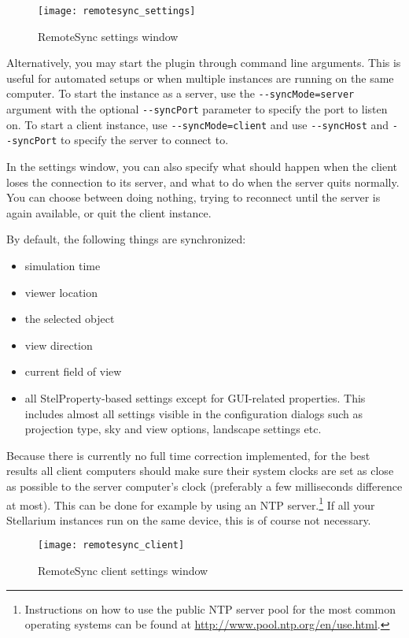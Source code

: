 \begin{figure}[h]
	\centering\texttt{[image: remotesync\_settings]}
	\caption{RemoteSync settings window}
	\label{fig:plugins:RemoteSync:settings}
\end{figure}

Alternatively, you may start the plugin through command line arguments. This is
useful for automated setups or when multiple instances are running on the same
computer. To start the instance as a server, use the
\texttt{-{}-syncMode=server} argument with the optional \texttt{-{}-syncPort}
parameter to specify the port to listen on. To start a client instance, use
\texttt{-{}-syncMode=client} and use \texttt{-{}-syncHost} and
\texttt{-{}-syncPort} to specify the server to connect to.

In the settings window, you can also specify what should happen when the client 
loses the connection to its server, and what to do when the server quits 
normally. You can choose between doing nothing, trying to reconnect until the 
server is again available, or quit the client instance.

By default, the following things are synchronized:
\begin{itemize}
	\item simulation time
	\item viewer location
	\item the selected object
	\item view direction
	\item current field of view
	\item all StelProperty-based settings except for GUI-related properties. 
	This includes almost all settings visible in the configuration dialogs such 
	as projection type, sky and view options, landscape settings etc.
\end{itemize}

Because there is currently no full time correction implemented, for the best
results all client computers should make sure their system clocks are set as
close as possible to the server computer's clock (preferably a few milliseconds
difference at most). This can be done for example by using an NTP server.\footnote{
Instructions on how to use the public NTP server pool for the most common
operating systems can be found at \url{http://www.pool.ntp.org/en/use.html}.} 
If all your Stellarium instances run on the same device, this is of course not 
necessary.

\begin{figure}[h]
	\centering\texttt{[image: remotesync\_client]}
	\caption{RemoteSync client settings window}
	\label{fig:plugins:RemoteSync:client}
\end{figure}

